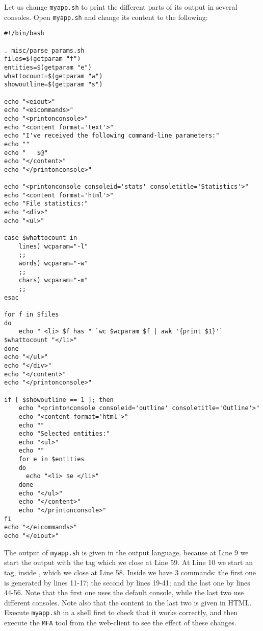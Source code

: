 Let us change \texttt{myapp.sh} to print the different parts of its
output in several consoles. Open \texttt{myapp.sh} and change its
content to the following:


\medskip
\begin{lstlisting}[style=script]
#!/bin/bash

. misc/parse_params.sh
files=$(getparam "f")
entities=$(getparam "e")
whattocount=$(getparam "w")
showoutline=$(getparam "s")

echo "<eiout>"
echo "<eicommands>"
echo "<printonconsole>"
echo "<content format='text'>"
echo "I've received the following command-line parameters:"
echo ""
echo "   $@"
echo "</content>"
echo "</printonconsole>"

echo "<printonconsole consoleid='stats' consoletitle='Statistics'>"
echo "<content format='html'>"
echo "File statistics:"
echo "<div>"
echo "<ul>"

case $whattocount in
    lines) wcparam="-l"
    ;;
    words) wcparam="-w"
    ;;
    chars) wcparam="-m"
    ;;
esac

for f in $files 
do
    echo " <li> $f has " `wc $wcparam $f | awk '{print $1}'` $whattocount "</li>"
done
echo "</ul>"
echo "</div>"
echo "</content>"
echo "</printonconsole>"

if [ $showoutline == 1 ]; then
    echo "<printonconsole consoleid='outline' consoletitle='Outline'>"
    echo "<content format='html'>"
    echo ""
    echo "Selected entities:"
    echo "<ul>"
    echo ""
    for e in $entities 
    do
      echo "<li> $e </li>"
    done
    echo "</ul>"
    echo "</content>"
    echo "</printonconsole>"
fi
echo "</eicommands>"
echo "</eiout>"
\end{lstlisting}

\medskip
\noindent
The output of \texttt{myapp.sh} is given in the \ei output language,
because at Line 9 we start the output with the tag  which
we close at Line 59.
%
At Line 10 we start an  tag, inside , which
we close at Line 58.
%
Inside  we have 3  commands:
%
the first one is generated by lines 11-17; the second by lines 19-41;
and the last one by lines 44-56.
%
Note that the first one uses the default console, while the last two
use different consoles. Note also that the content in the last two is
given in HTML.
%
Execute \texttt{myapp.sh} in a shell first to check that it works
correctly, and then execute the \texttt{MFA} tool from the web-client
to see the effect of these changes.

